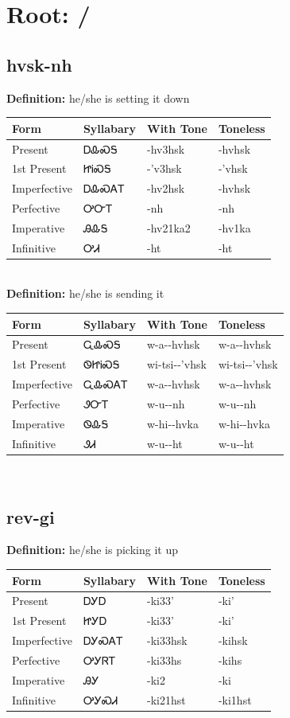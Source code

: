\documentclass{article}%
\begin{document}
%
\normalsize%
\section*{Root:  / }%
\subsection*{hvsk-nh}%
\textbf{Definition: }%
he/she is setting it down%
\\[0.5em]%
\begin{tabular}{|l|l|l|l|}%
\hline%
\textbf{Form}&\textbf{Syllabary}&\textbf{With Tone}&\textbf{Toneless}\\%
\hline%
Present&ᎠᎲᏍᎦ&{-}hv3hsk&{-}hvhsk\\%
1st Present&ᏥᎥᏍᎦ&{-}'v3hsk&{-}'vhsk\\%
Imperfective&ᎠᎲᏍᎪᎢ&{-}hv2hsk&{-}hvhsk\\%
Perfective&ᎤᏅᎢ&{-}nh&{-}nh\\%
Imperative&ᎯᎲᎦ&{-}hv21ka2&{-}hv1ka\\%
Infinitive&ᎤᏗ&{-}ht&{-}ht\\%
\hline%
\end{tabular}%
\\[1em]%
\textbf{Definition: }%
he/she is sending it%
\\[0.5em]%
\begin{tabular}{|l|l|l|l|}%
\hline%
\textbf{Form}&\textbf{Syllabary}&\textbf{With Tone}&\textbf{Toneless}\\%
\hline%
Present&ᏩᎲᏍᎦ&w{-}a{-}{-}hvhsk&w{-}a{-}{-}hvhsk\\%
1st Present&ᏫᏥᎥᏍᎦ&wi{-}tsi{-}{-}'vhsk&wi{-}tsi{-}{-}'vhsk\\%
Imperfective&ᏩᎲᏍᎪᎢ&w{-}a{-}{-}hvhsk&w{-}a{-}{-}hvhsk\\%
Perfective&ᏭᏅᎢ&w{-}u{-}{-}nh&w{-}u{-}{-}nh\\%
Imperative&ᏫᎲᎦ&w{-}hi{-}{-}hvka&w{-}hi{-}{-}hvka\\%
Infinitive&ᏭᏗ&w{-}u{-}{-}ht&w{-}u{-}{-}ht\\%
\hline%
\end{tabular}%
\\[1em]%
\subsection*{rev-gi}%
\textbf{Definition: }%
he/she is picking it up%
\\[0.5em]%
\begin{tabular}{|l|l|l|l|}%
\hline%
\textbf{Form}&\textbf{Syllabary}&\textbf{With Tone}&\textbf{Toneless}\\%
\hline%
Present&ᎠᎩᎠ&{-}ki33'&{-}ki'\\%
1st Present&ᏥᎩᎠ&{-}ki33'&{-}ki'\\%
Imperfective&ᎠᎩᏍᎪᎢ&{-}ki33hsk&{-}kihsk\\%
Perfective&ᎤᎩᏒᎢ&{-}ki33hs&{-}kihs\\%
Imperative&ᎯᎩ&{-}ki2&{-}ki\\%
Infinitive&ᎤᎩᏍᏗ&{-}ki21hst&{-}ki1hst\\%
\hline%
\end{tabular}%
\\[1em]%
\end{document}

